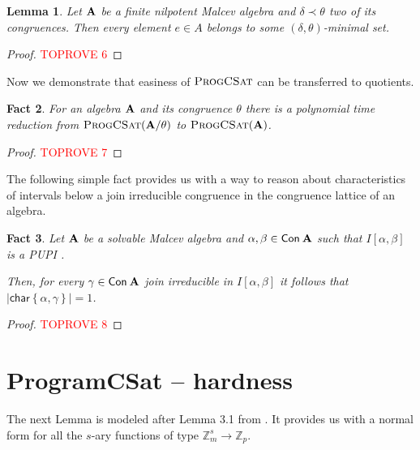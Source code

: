 \documentclass[11pt,a4paper]{amsart}
\newtheorem{lm}{Lemma}[section]
\newtheorem{fact}[lm]{Fact}
\newcommand{\m}[1]{{\uppercase {\bf{#1}}}}
\newcommand{\set}[1]{{\left\{ {#1} \right\} }}
\newcommand{\intv}[2]{I\left[#1,#2\right]}
\newcommand{\con}[1]{{\sf Con\:\m{#1}}}
\newcommand{\map}{\longrightarrow}
\newcommand{\gProblem}[2]{\ensuremath{\operatorname{\textup{\textsc{{#2}}}}
		\ifthenelse{\equal{#1}{}}{}{\!\left( {#1} \right)}}}
\newcommand{\progcsat}[1]{\gProblem{#1}{ProgCSat}}
\newcommand{\pupi}{PUPI }
\newcommand{\charr}{\mathsf{char}}
\newcommand{\charrset}[1]{\charr\set{#1}}
\newcommand{\z}{\mathbb{Z}}
\begin{document}
\begin{lm}
\label{lm:minset}
Let $\m A$ be a finite nilpotent Malcev algebra
and $\delta\prec\theta$ two of its congruences.
Then every element $e\in A$ belongs to some $(\delta,\theta)$-minimal set.
\end{lm}

\begin{proof}\textcolor{red}{TOPROVE 6}\end{proof}



Now we demonstrate that easiness of \progcsat{} can be transferred to quotients. 
\begin{fact}

\label{fact:quotient}
For an algebra $\m A$ and its congruence $\theta$
there is a polynomial time reduction from \progcsat{\m A/\theta} to \progcsat{\m A}.
\end{fact}

\begin{proof}\textcolor{red}{TOPROVE 7}\end{proof}

The following simple fact provides us with a way to reason about characteristics of intervals below a join irreducible congruence in the congruence lattice of an algebra.

\begin{fact}\label{fact:ji-PUPI}
Let $\m A$ be a solvable Malcev algebra and $\alpha,\beta\in \con{A}$ such that $\intv{\alpha}{\beta}$ is a \pupi.

Then,  for every $\gamma\in\con{A}$ join irreducible in $\intv{\alpha}{\beta}$ it follows that $|\charrset{\alpha,\gamma}|=1$.
\end{fact}
\begin{proof}\textcolor{red}{TOPROVE 8}\end{proof}


\section{ProgramCSat -- hardness}
\label{section:hard}


The next Lemma is modeled after  Lemma 3.1 from \cite{ikk:mfcs}. It provides us with a normal form for all the $s$-ary functions of type $\z_m^s \map \z_p$.
\end{document}
